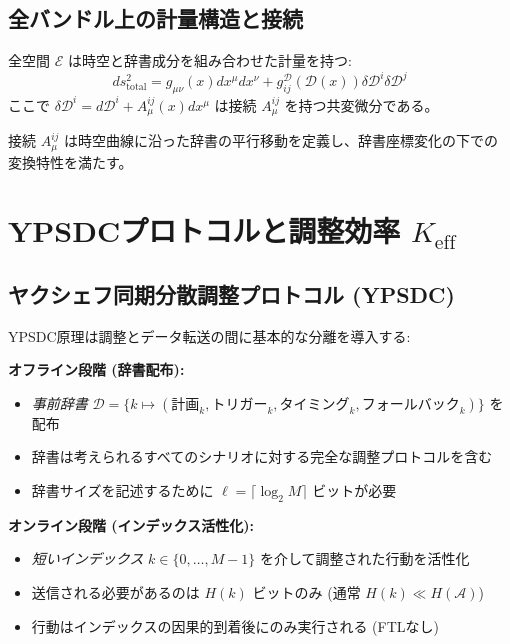 \documentclass[11pt,a4paper]{article}
\begin{document}
	\subsection{全バンドル上の計量構造と接続}
	全空間 $\mathcal{E}$ は時空と辞書成分を組み合わせた計量を持つ:
	\begin{equation}
		ds^2_{\text{total}} = g_{\mu\nu}(x) dx^\mu dx^\nu + g_{ij}^{\mathcal{D}}(\mathcal{D}(x)) \delta\mathcal{D}^i \delta\mathcal{D}^j
	\end{equation}
	ここで $\delta\mathcal{D}^i = d\mathcal{D}^i + A_\mu^{ij}(x) dx^\mu$ は接続 $A_\mu^{ij}$ を持つ共変微分である。
	
	接続 $A_\mu^{ij}$ は時空曲線に沿った辞書の平行移動を定義し、辞書座標変化の下での変換特性を満たす。
	
	\section{YPSDCプロトコルと調整効率 \texorpdfstring{$K_{\mathrm{eff}}$}{K_eff}}
	
	\subsection{ヤクシェフ同期分散調整プロトコル (YPSDC)}
	YPSDC原理は調整とデータ転送の間に基本的な分離を導入する:
	
	\begin{tcolorbox}[title=YPSDC原理, colback=blue!5!white, colframe=blue!50!black]
		\textbf{オフライン段階 (辞書配布):}
		\begin{itemize}
			\item \emph{事前辞書} $\mathcal{D} = \{k \mapsto (\text{計画}_k, \text{トリガー}_k, \text{タイミング}_k, \text{フォールバック}_k)\}$ を配布
			\item 辞書は考えられるすべてのシナリオに対する完全な調整プロトコルを含む
			\item 辞書サイズを記述するために $\ell = \lceil \log_2 M \rceil$ ビットが必要
		\end{itemize}
		
		\textbf{オンライン段階 (インデックス活性化):}
		\begin{itemize}
			\item \emph{短いインデックス} $k \in \{0, \dots, M-1\}$ を介して調整された行動を活性化
			\item 送信される必要があるのは $H(k)$ ビットのみ (通常 $H(k) \ll H(\mathcal{A})$)
			\item 行動はインデックスの因果的到着後にのみ実行される (FTLなし)
		\end{itemize}
	\end{tcolorbox}
	
\end{document}
